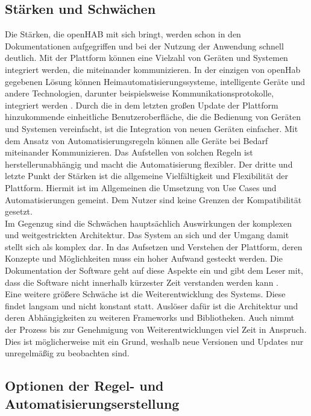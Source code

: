 \subsection{Stärken und Schwächen}
    Die Stärken, die openHAB mit sich bringt, werden schon in den Dokumentationen aufgegriffen und bei der Nutzung der Anwendung 
    schnell deutlich. Mit der Plattform können eine Vielzahl von Geräten und Systemen integriert werden, die miteinander 
    kommunizieren. In der einzigen von openHab gegebenen Lösung können Heimautomatisierungssysteme, intelligente Geräte und 
    andere Technologien, darunter beispielsweise Kommunikationsprotokolle, integriert werden \cite{openhab-strength}. Durch die in 
    dem letzten großen Update der Plattform hinzukommende einheitliche Benutzeroberfläche, die die Bedienung von Geräten und 
    Systemen vereinfacht, ist die Integration von neuen Geräten einfacher. Mit dem Ansatz von 
    Automatisierungsregeln können alle Geräte bei Bedarf miteinander Kommunizieren. Das Aufstellen von solchen Regeln ist 
    herstellerunabhängig und macht die Automatisierung flexibler. Der dritte und letzte Punkt der Stärken ist die allgemeine 
    Vielfältigkeit und Flexibilität der Plattform. Hiermit ist im Allgemeinen die Umsetzung von Use Cases und Automatisierungen 
    gemeint. Dem Nutzer sind keine Grenzen der Kompatibilität gesetzt.
    \\
    \linebreak
    Im Gegenzug sind die Schwächen hauptsächlich Auswirkungen der komplexen und weitgestrickten Architektur. Das System an sich 
    und der Umgang damit stellt sich als komplex dar. In das Aufsetzen und Verstehen der Plattform, deren Konzepte und 
    Möglichkeiten muss ein hoher Aufwand gesteckt werden. Die Dokumentation der Software geht auf diese Aspekte ein und gibt dem 
    Leser mit, dass die Software nicht innerhalb kürzester Zeit verstanden werden kann \cite{openhab-strength}. 
    \\
    Eine weitere größere Schwäche ist die Weiterentwicklung des Systems. Diese findet langsam und nicht konstant statt. Auslöser 
    dafür ist die Architektur und deren Abhängigkeiten zu weiteren Frameworks und Bibliotheken. Auch nimmt der Prozess bis zur 
    Genehmigung von Weiterentwicklungen viel Zeit in Anspruch. Dies ist möglicherweise mit ein Grund, weshalb neue Versionen und 
    Updates nur unregelmäßig zu beobachten sind. 

    \subsection{Optionen der Regel- und Automatisierungserstellung}

